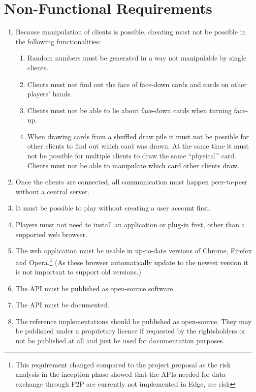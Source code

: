 \section{Non-Functional Requirements} \label{sec:nonfunctionalreq}

\begin{enumerate}
  \item Because manipulation of clients is possible, cheating must not be
  possible in the following functionalities:
  \begin{enumerate}
    \item \label{itm:distributedrandomness} Random numbers must be generated in
    a way not manipulable by single clients.
    \item Clients must not find out the \gls{face} of \gls{face}-down cards and
    cards on other players' \glspl{hand}.
    \item Clients must not be able to lie about \gls{face}-down cards when
    turning \gls{face}-up.
    \item \label{itm:mentalpoker} When drawing cards from a shuffled
    \gls{draw pile} it must not be possible for other clients to find out which
    card was drawn. At the same time it must not be possible for multiple
    clients to draw the same ``physical'' card. Clients must not be able to
    manipulate which card other clients draw.
  \end{enumerate}
  \item Once the clients are connected, all communication must happen
  \gls{peer-to-peer} without a central server.
  \item It must be possible to play without creating a user account first.
  \item Players must not need to install an application or plug-in first, other
  than a supported web browser.
  \item \label{itm:supportedbrowsers} The web application must be usable in
  up-to-date versions of Chrome, Firefox and Opera.\footnote{This requirement
  changed compared to the project proposal as the risk analysis in the
  inception phase showed that the APIs needed for data exchange through
  \gls{P2P} are currently not implemented in Edge, see risk
  } (As these browser automatically update to the
  newest version it is not important to support old versions.)
  \item The API must be published as open-source software.
  \item The API must be documented.
  \item The reference implementations should be published as open-source. They
  may be published under a proprietary licence if requested by the rightsholders
  or not be published at all and just be used for documentation purposes.
\end{enumerate}

